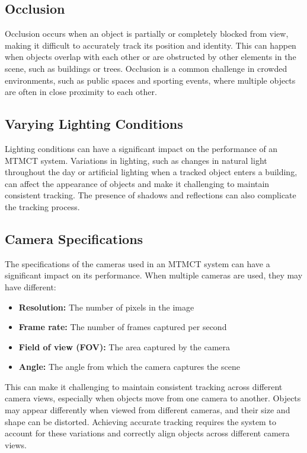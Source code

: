 \subsection{Occlusion}\label{subsec:occlusion}
Occlusion occurs when an object is partially or completely blocked from view, making it difficult to accurately track its position and identity. This can happen when objects overlap with each other or are obstructed by other elements in the scene, such as buildings or trees. Occlusion is a common challenge in crowded environments, such as public spaces and sporting events, where multiple objects are often in close proximity to each other.

\subsection{Varying Lighting Conditions}\label{subsec:varying_lighting_conditions}
Lighting conditions can have a significant impact on the performance of an MTMCT system. Variations in lighting, such as changes in natural light throughout the day or artificial lighting when a tracked object enters a building, can affect the appearance of objects and make it challenging to maintain consistent tracking. The presence of shadows and reflections can also complicate the tracking process.

\subsection{Camera Specifications}\label{subsec:camera_specification}
The specifications of the cameras used in an MTMCT system can have a significant impact on its performance. When multiple cameras are used, they may have different:

\begin{itemize}
    \item \textbf{Resolution:} The number of pixels in the image
    \item \textbf{Frame rate:} The number of frames captured per second
    \item \textbf{Field of view (FOV):} The area captured by the camera
    \item \textbf{Angle:} The angle from which the camera captures the scene
\end{itemize}

This can make it challenging to maintain consistent tracking across different camera views, especially when objects move from one camera to another. Objects may appear differently when viewed from different cameras, and their size and shape can be distorted. Achieving accurate tracking requires the system to account for these variations and correctly align objects across different camera views.

